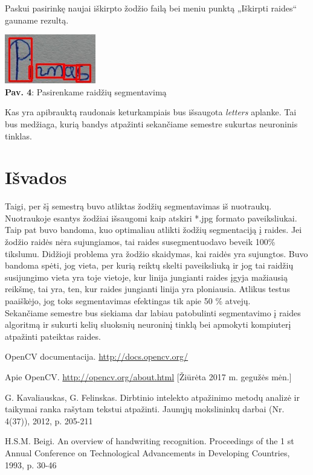 \documentclass[a4paper,12pt]{article}
\begin{document}
Paskui pasirinkę naujai iškirpto žodžio failą bei meniu punktą „Iškirpti raides“ gauname rezultą. 

\begin{center}
	\includegraphics[scale=0.7]{img/4.jpg}\\
	\textbf{Pav. 4}: Pasirenkame raidžių segmentavimą\\
\end{center}

Kas yra apibrauktą raudonais keturkampiais bus išsaugota \textit{letters}  aplanke. Tai bus medžiaga, kurią bandys atpažinti sekančiame semestre sukurtas neuroninis tinklas.

\clearpage
\section*{Išvados}
Taigi, per šį semestrą buvo atliktas žodžių segmentavimas iš nuotraukų. Nuotraukoje esantys žodžiai išsaugomi kaip atskiri *.jpg formato paveiksliukai. Taip pat buvo bandoma, kuo optimaliau atlikti žodžių segmentaciją į raides. Jei žodžio raidės nėra sujungiamos, tai raides susegmentuodavo beveik 100\% tikslumu. Didžioji problema yra žodžio skaidymas, kai raidės yra sujungtos. Buvo bandoma spėti, jog vieta, per kurią reiktų skelti paveiksliuką ir jog tai raidžių susijungimo vieta yra toje vietoje, kur linija jungianti raides įgyja mažiausią reikšmę, tai yra, ten, kur raides jungianti linija yra ploniausia. Atlikus testus paaiškėjo, jog toks segmentavimas efektingas tik apie 50 \% atvejų.\\
\indent Sekančiame semestre bus siekiama dar labiau patobulinti segmentavimo į raides algoritmą ir sukurti kelių sluoksnių neuroninį tinklą bei apmokyti kompiuterį atpažinti pateiktas raides.

\newpage
\renewcommand{\refname}{Literatūra}
\begin{thebibliography}{99}

OpenCV documentacija. 
\url{http://docs.opencv.org/}

Apie OpenCV.
\url{http://opencv.org/about.html}
[Žiūrėta 2017 m. gegužės mėn.]

G.  Kavaliauskas, G. Felinskas. Dirbtinio intelekto atpažinimo metodų analizė ir taikymai ranka rašytam tekstui atpažinti. Jaunųjų mokslininkų darbai  (Nr. 4(37)), 2012, p. 205-211

H.S.M. Beigi.  An overview of handwriting recognition. Proceedings of the 1 st Annual Conference on Technological Advancements in Developing Countries, 1993, p. 30-46

\end{thebibliography}
\end{document}
